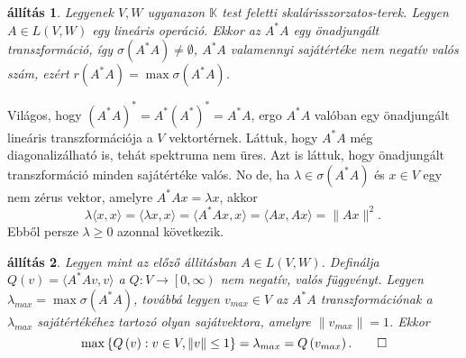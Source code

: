 \documentclass[a4paper, showtrims]{memoir}
\makeatletter
\renewenvironment{proof}[1][\proofname]
    {\par\pushQED{\qed}%
    \normalfont \topsep6\p@\@plus6\p@\relax
    \trivlist
    \item[\hskip\labelsep
        \itshape
    #1\@addpunct{:}]\ignorespaces}
    {\popQED\endtrivlist\@endpefalse}
\theoremstyle{plain}
\newtheorem{proposition}{állítás}[chapter]
\theoremstyle{remark}
\theoremstyle{definition}
\newcommand{\ip}[2]{\langle#1,#2\rangle}
\makeatother
\begin{document}
\begin{proposition}
	Legyenek $V,W$ ugyanazon $\mathbb{K}$ test feletti skalárisszorzatos-terek.
	Legyen $A\in L\left( V,W \right)$ egy lineáris operáció.
	Ekkor az $A^\ast A$ egy önadjungált transzformáció,
	így $\sigma\left( A^\ast A \right)\neq \emptyset$,
	$A^\ast A$ valamennyi sajátértéke nem negatív valós szám,
	ezért
	$r\left( A^\ast A \right)=\max\sigma\left( A^\ast A \right)$.
\end{proposition}
\begin{proof}
	Világos, hogy $(A^\ast A)^\ast=A^\ast (A^\ast)^\ast=A^\ast A$,
	ergo $A^\ast A$ valóban egy önadjungált lineáris transzformációja a $V$ vektortérnek.
	Láttuk, hogy $A^\ast A$ még diagonalizálható is, tehát spektruma nem üres.
	Azt is láttuk, hogy önadjungált transzformáció minden sajátértéke valós.
	No de, ha $\lambda\in\sigma\left( A^\ast A \right)$ és $x\in V$ egy nem zérus vektor,
	amelyre $A^\ast Ax=\lambda x$, akkor
	\[
		\lambda\ip{x}{x}
		=
		\ip{\lambda x}{x}
		=
		\ip{A^\ast Ax}{x}
		=
		\ip{Ax}{Ax}
		=\|Ax\|^2.
		\
	\]
	Ebből persze $\lambda\geq 0$ azonnal következik.
\end{proof}
\begin{proposition}
	Legyen mint az előző állitásban $A\in L\left( V,W \right)$.
	Definálja $Q\left( v \right)=\ip{A^\ast Av}{v}$ a $Q:V\to\left[ 0,\infty \right)$ nem negatív, valós függvényt.
	Legyen $\lambda_{max}=\max\sigma\left( A^\ast A \right)$,
	továbbá legyen
	$v_{max}\in V$ az $A^\ast A$ transzformációnak a $\lambda_{max}$ sajátértékéhez tartozó olyan sajátvektora,
	amelyre $\|v_{max}\|=1$.
	Ekkor
	\[
		\max\left\{ Q\left( v \right):v\in V,\|v\|\leq 1 \right\}
		=
		\lambda_{max}
		=
		Q\left( v_{max} \right).
		\qedhere
	\]
\end{proposition}
\end{document}
